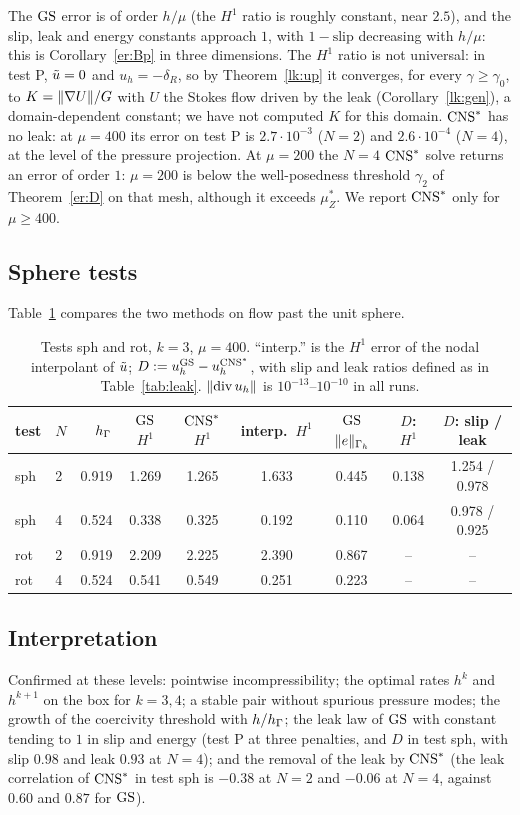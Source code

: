 The $\mathrm{GS}$ error is of order $h/\mu$ (the $H^1$ ratio is roughly constant, near $2.5$), and the slip, leak and energy constants approach $1$, with $1-\text{slip}$ decreasing with $h/\mu$: this is Corollary~\ref{er:Bp} in three dimensions. The $H^1$ ratio is not universal: in test P, $\tilde u=0$ and $u_h=-\delta_R$, so by Theorem~\ref{lk:up} it converges, for every $\gamma\ge\gamma_0$, to $K=\lVert \nabla U\rVert/G$ with $U$ the Stokes flow driven by the leak (Corollary~\ref{lk:gen}), a domain-dependent constant; we have not computed $K$ for this domain. $\mathrm{CNS}^\ast$ has no leak: at $\mu=400$ its error on test P is $2.7\cdot10^{-3}$ ($N=2$) and $2.6\cdot10^{-4}$ ($N=4$), at the level of the pressure projection. At $\mu=200$ the $N=4$ $\mathrm{CNS}^\ast$ solve returns an error of order $1$: $\mu=200$ is below the well-posedness threshold $\gamma_2$ of Theorem~\ref{er:D} on that mesh, although it exceeds $\mu_Z^\ast$. We report $\mathrm{CNS}^\ast$ only for $\mu\ge400$.

\subsection{Sphere tests}
Table~\ref{tab:sphere} compares the two methods on flow past the unit sphere.
\begin{table}[ht]
\centering\small
\caption{Tests sph and rot, $k=3$, $\mu=400$. ``interp.'' is the $H^1$ error of the nodal interpolant of $\tilde u$; $D:=u_h^{\mathrm{GS}}-u_h^{\mathrm{CNS}^\ast}$, with slip and leak ratios defined as in Table~\ref{tab:leak}. $\lVert \operatorname{div} u_h\rVert$ is $10^{-13}$--$10^{-10}$ in all runs.}\label{tab:sphere}
\begin{tabular}{llrcccccc}
\toprule
test & $N$ & $h_\Gamma$ & $\mathrm{GS}$ $H^1$ & $\mathrm{CNS}^\ast$ $H^1$ & interp.\ $H^1$ & $\mathrm{GS}$ $\lVert e\rVert_{\Gamma_h}$ & $D$: $H^1$ & $D$: slip / leak\\
\midrule
sph&2&0.919&1.269&1.265&1.633&0.445&0.138&1.254 / 0.978\\
sph&4&0.524&0.338&0.325&0.192&0.110&0.064&0.978 / 0.925\\
rot&2&0.919&2.209&2.225&2.390&0.867&--&--\\
rot&4&0.524&0.541&0.549&0.251&0.223&--&--\\
\bottomrule
\end{tabular}
\end{table}

\subsection{Interpretation}
Confirmed at these levels: pointwise incompressibility; the optimal rates $h^k$ and $h^{k+1}$ on the box for $k=3,4$; a stable pair without spurious pressure modes; the growth of the coercivity threshold with $h/h_\Gamma$; the leak law of $\mathrm{GS}$ with constant tending to $1$ in slip and energy (test P at three penalties, and $D$ in test sph, with slip $0.98$ and leak $0.93$ at $N=4$); and the removal of the leak by $\mathrm{CNS}^\ast$ (the leak correlation of $\mathrm{CNS}^\ast$ in test sph is $-0.38$ at $N=2$ and $-0.06$ at $N=4$, against $0.60$ and $0.87$ for $\mathrm{GS}$).

